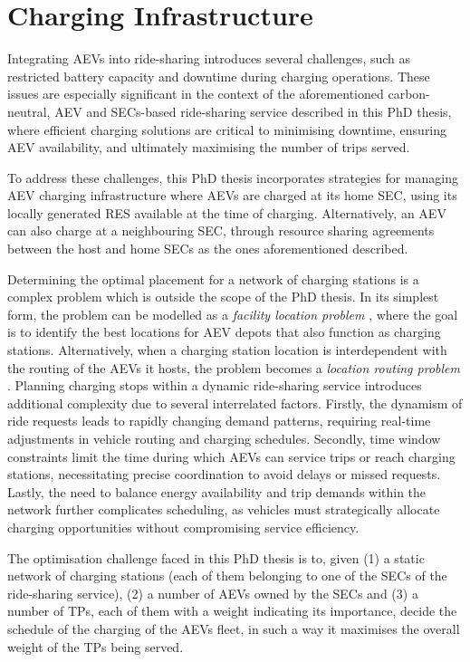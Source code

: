\section{Charging Infrastructure}
\label{sec:charging}

Integrating AEVs into ride-sharing introduces several challenges, such as restricted battery capacity and downtime during charging operations. These issues are especially significant in the context of the aforementioned carbon-neutral, AEV and SECs-based ride-sharing service described in this PhD thesis, where efficient charging solutions are critical to minimising downtime, ensuring AEV availability, and ultimately maximising the number of trips served. 

To address these challenges, this PhD thesis incorporates strategies for managing AEV charging infrastructure where AEVs are charged at its home SEC, using its locally generated RES available at the time of charging.
Alternatively, an AEV can also charge at a neighbouring SEC, through resource sharing agreements between the host and home SECs as the ones aforementioned described.

Determining the optimal placement for a network of charging stations is a complex problem which is outside the scope of the PhD thesis. In its simplest form, the problem can be modelled as a \textit{facility location problem} \cite{ortiz2018multi}, where the goal is to identify the best locations for AEV depots that also function as charging stations. Alternatively, when a charging station location is interdependent with the routing of the AEVs it hosts, the problem becomes a \textit{location routing problem} \cite{ortiz2018multi}. Planning charging stops within a dynamic ride-sharing service introduces additional complexity due to several interrelated factors. Firstly, the dynamism of ride requests leads to rapidly changing demand patterns, requiring real-time adjustments in vehicle routing and charging schedules. Secondly, time window constraints limit the time during which AEVs can service trips or reach charging stations, necessitating precise coordination to avoid delays or missed requests. Lastly, the need to balance energy availability and trip demands within the network further complicates scheduling, as vehicles must strategically allocate charging opportunities without compromising service efficiency.

The optimisation challenge faced in this PhD thesis is to, given (1) a static network of charging stations (each of them belonging to one of the SECs of the ride-sharing service), (2) a number of AEVs owned by the SECs and (3) a number of TPs, each of them with a weight indicating its importance, decide the schedule of the charging of the AEVs fleet, in such a way it maximises the overall weight of the TPs being served.

